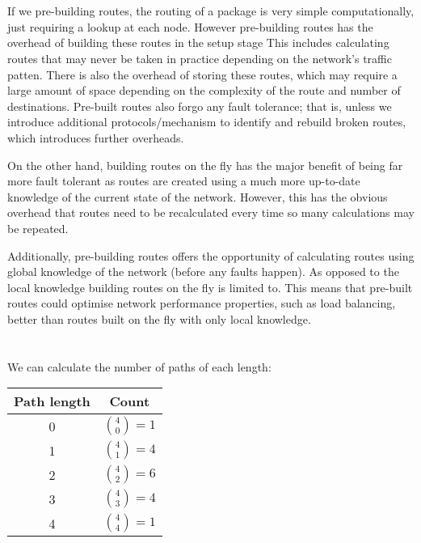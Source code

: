 \section{}
If we pre-building routes, the routing of a package is very simple computationally, just requiring a lookup at each node.
However pre-building routes has the overhead of building these routes in the setup stage
This includes calculating routes that may never be taken in practice depending on the network's traffic patten.
There is also the overhead of storing these routes, which may require a large amount of space depending on the complexity of the route and number of destinations.
Pre-built routes also forgo any fault tolerance; that is, unless we introduce additional protocols/mechanism to identify and rebuild broken routes, which introduces further overheads.


On the other hand, building routes on the fly has the major benefit of being far more fault tolerant as routes are created using a much more up-to-date knowledge of the current state of the network.
However, this has the obvious overhead that routes need to be recalculated every time so many calculations may be repeated.

Additionally, pre-building routes offers the opportunity of calculating routes using global knowledge of the network (before any faults happen).
As opposed to the local knowledge building routes on the fly is limited to.
This means that pre-built routes could optimise network performance properties, such as load balancing, better than routes built on the fly with only local knowledge. 

\section{}
\subsection{}
We can calculate the number of paths of each length:
\begin{center}
    \begin{tabular}{c|c}
        Path length & Count\\
        \hline
        0 & ${4 \choose 0} = 1$ \\
        1 &  ${4 \choose 1} = 4$\\
        2 &  ${4 \choose 2} = 6$\\
        3 &  ${4 \choose 3} = 4$\\
        4 &  ${4 \choose 4} = 1$\\
    \end{tabular}
\end{center}
    
